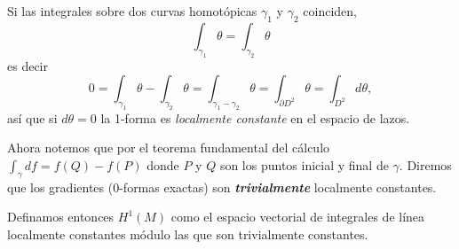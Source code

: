 \documentclass[spanish]{article}
\theoremstyle{definition}
\begin{document}
	Si las integrales sobre dos curvas homotópicas $\gamma_1$ y $\gamma_2$ coinciden,
	\[\int_{\gamma_1}\theta=\int_{\gamma_2}\theta\]
	es decir
	\[0=\int_{\gamma_1}\theta-\int_{\gamma_2}\theta=\int_{\gamma_1-\gamma_2}\theta=\int_{\partial D^2}\theta=\int_{D^2}d\theta,\]
	así que si $d\theta=0$ la 1-forma es \textit{localmente constante} en el espacio de lazos.
	
	Ahora notemos que por el teorema fundamental del cálculo $\int_\gamma df=f(Q)-f(P)$ donde $P$ y $Q$ son los puntos inicial y final de $\gamma$. Diremos que los gradientes (0-formas exactas) son \textbf{\textit{trivialmente}} localmente constantes.
	
	Definamos entonces $H^1(M)$ como el espacio vectorial de integrales de línea localmente constantes módulo las que son trivialmente constantes.
	
\end{document}
